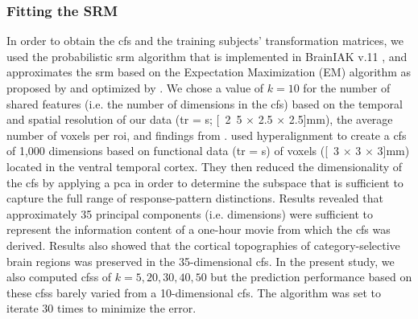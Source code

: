 \subsubsection{Fitting the SRM}
%
In order to obtain the \ac{cfs} and the training subjects' transformation
matrices, we used the probabilistic \ac{srm} algorithm that is implemented in
BrainIAK v.11 \citep[Brain Imaging Analysis Kit;][]{kumar2020brainiak,
kumar2020brainiaktutorial}, and approximates the \ac{srm} based on the
Expectation Maximization (EM) algorithm as proposed by \citet{chen2015reduced}
and optimized by \citet{anderson2016enabling}.
%
%
We chose a value of $k=10$ for the number of shared features (i.e. the number of
dimensions in the \ac{cfs}) based on the temporal and spatial resolution of our
data (\ac{tr} = \unit[2]{s}; \unit[2.5 $\times$ 2.5 $\times$ 2.5]{mm}), the
average number of voxels per \ac{roi}, and findings from
\citet{haxby2011common}.
%
\citet{haxby2011common} used hyperalignment to create a \ac{cfs} of 1,000
dimensions based on functional data (\ac{tr} = \unit[3]{s}) of voxels (\unit[3
$\times$ 3 $\times$ 3]{mm}) located in the ventral temporal cortex.
%
They then reduced the dimensionality of the \ac{cfs} by applying a \ac{pca} in
order to determine the subspace that is sufficient to capture the full range of
response-pattern distinctions.
%
Results revealed that approximately 35 principal components (i.e. dimensions)
were sufficient to represent the information content of a one-hour movie from
which the \ac{cfs} was derived.
%
Results also showed that the cortical topographies of category-selective brain
regions was preserved in the 35-dimensional \ac{cfs}.
In the present study, we also computed \acp{cfs} of $k=5, 20, 30, 40, 50$ but
the prediction performance based on these \acp{cfs} barely varied from a
10-dimensional \ac{cfs}.
The algorithm was set to iterate 30 times to minimize the error.

